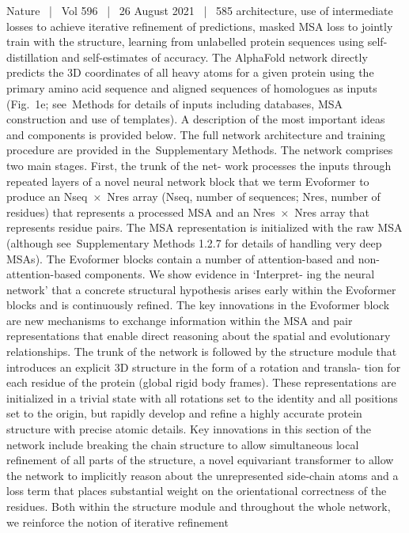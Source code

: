 Nature  |  Vol 596  |  26 August 2021  |  585
architecture, use of intermediate losses to achieve iterative refinement
of predictions, masked MSA loss to jointly train with the structure,
learning from unlabelled protein sequences using self-distillation and
self-estimates of accuracy.
The AlphaFold network directly predicts the 3D coordinates of all
heavy atoms for a given protein using the primary amino acid sequence
and aligned sequences of homologues as inputs (Fig. 1e; see Methods
for details of inputs including databases, MSA construction and use of
templates). A description of the most important ideas and components
is provided below. The full network architecture and training procedure
are provided in the Supplementary Methods.
The network comprises two main stages. First, the trunk of the net-
work processes the inputs through repeated layers of a novel neural
network block that we term Evoformer to produce an Nseq × Nres array
(Nseq, number of sequences; Nres, number of residues) that represents
a processed MSA and an Nres × Nres array that represents residue pairs.
The MSA representation is initialized with the raw MSA (although
see Supplementary Methods 1.2.7 for details of handling very deep
MSAs). The Evoformer blocks contain a number of attention-based
and non-attention-based components. We show evidence in ‘Interpret-
ing the neural network’ that a concrete structural hypothesis arises
early within the Evoformer blocks and is continuously refined. The key
innovations in the Evoformer block are new mechanisms to exchange
information within the MSA and pair representations that enable direct
reasoning about the spatial and evolutionary relationships.
The trunk of the network is followed by the structure module that
introduces an explicit 3D structure in the form of a rotation and transla-
tion for each residue of the protein (global rigid body frames). These
representations are initialized in a trivial state with all rotations set to
the identity and all positions set to the origin, but rapidly develop and
refine a highly accurate protein structure with precise atomic details.
Key innovations in this section of the network include breaking the
chain structure to allow simultaneous local refinement of all parts of
the structure, a novel equivariant transformer to allow the network to
implicitly reason about the unrepresented side-chain atoms and a loss
term that places substantial weight on the orientational correctness
of the residues. Both within the structure module and throughout
the whole network, we reinforce the notion of iterative refinement
